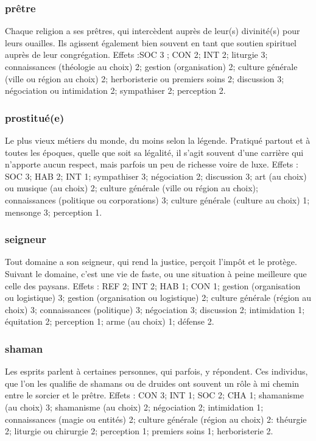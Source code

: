 \documentclass[10pt,a4paper,twocolumn]{book}
\begin{document}
\subsubsection{prêtre}
Chaque religion a ses prêtres, qui intercèdent auprès de leur(s) divinité(s) pour leurs ouailles. Ils agissent également bien souvent en tant que soutien spirituel auprès de leur congrégation.
Effets :SOC 3 ; CON 2; INT 2; liturgie 3; connaissances (théologie au choix) 2; gestion (organisation) 2; culture générale (ville ou région au choix) 2; herboristerie ou premiers soins 2; discussion 3; négociation ou intimidation 2; sympathiser 2; perception 2.
\subsubsection{prostitué(e)}
Le plus vieux métiers du monde, du moins selon la légende. Pratiqué partout et à toutes les époques, quelle que soit sa légalité, il s’agit souvent d’une carrière qui n’apporte aucun respect, mais parfois un peu de richesse voire de luxe. 
Effets : SOC 3; HAB 2; INT 1; sympathiser 3; négociation 2; discussion 3; art (au choix) ou musique (au choix) 2; culture générale (ville ou région au choix); connaissances (politique ou corporations) 3; culture générale (culture au choix) 1; mensonge 3; perception 1.
\subsubsection{seigneur}
Tout domaine a son seigneur, qui rend la justice, perçoit l’impôt et le protège. Suivant le domaine, c’est une vie de faste, ou une situation à peine meilleure que celle des paysans.
Effets : REF 2; INT 2; HAB 1; CON 1; gestion (organisation ou logistique) 3; gestion (organisation ou logistique) 2; culture générale (région au choix) 3; connaissances (politique) 3; négociation 3; discussion 2; intimidation 1; équitation 2; perception 1; arme (au choix) 1; défense 2.
\subsubsection{shaman}
Les esprits parlent à certaines personnes, qui parfois, y répondent. Ces individus, que l'on les qualifie de shamans ou de druides ont souvent un rôle à mi chemin entre le sorcier et le prêtre.
Effets : CON 3; INT 1; SOC 2; CHA 1; shamanisme (au choix) 3; shamanisme (au choix) 2; négociation 2; intimidation 1; connaissances (magie ou entités) 2; culture générale (région au choix) 2: théurgie 2; liturgie ou chirurgie 2; perception 1; premiers soins 1; herboristerie 2.
\end{document}
